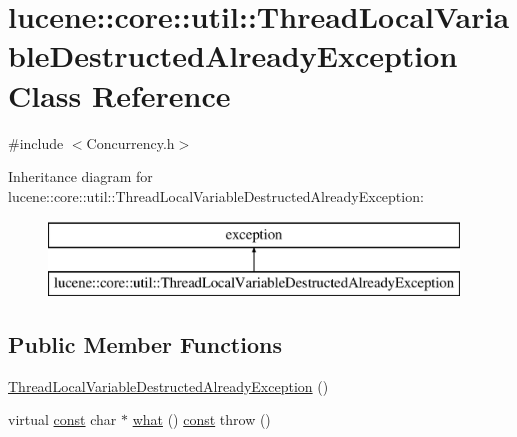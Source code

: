 \hypertarget{classlucene_1_1core_1_1util_1_1ThreadLocalVariableDestructedAlreadyException}{}\section{lucene\+:\+:core\+:\+:util\+:\+:Thread\+Local\+Variable\+Destructed\+Already\+Exception Class Reference}
\label{classlucene_1_1core_1_1util_1_1ThreadLocalVariableDestructedAlreadyException}


{\ttfamily \#include $<$Concurrency.\+h$>$}

Inheritance diagram for lucene\+:\+:core\+:\+:util\+:\+:Thread\+Local\+Variable\+Destructed\+Already\+Exception\+:\begin{figure}[H]
\begin{center}
\leavevmode
\includegraphics[height=2.000000cm]{classlucene_1_1core_1_1util_1_1ThreadLocalVariableDestructedAlreadyException}
\end{center}
\end{figure}
\subsection*{Public Member Functions}
\begin{DoxyCompactItemize}
\item 
\mbox{\hyperlink{classlucene_1_1core_1_1util_1_1ThreadLocalVariableDestructedAlreadyException_aeead4938bdae97721f6aa94bcdace7a4}{Thread\+Local\+Variable\+Destructed\+Already\+Exception}} ()
\item 
virtual \mbox{\hyperlink{ZlibCrc32_8h_a2c212835823e3c54a8ab6d95c652660e}{const}} char $\ast$ \mbox{\hyperlink{classlucene_1_1core_1_1util_1_1ThreadLocalVariableDestructedAlreadyException_a519acaa7126c57d0c66b1101afa97d38}{what}} () \mbox{\hyperlink{ZlibCrc32_8h_a2c212835823e3c54a8ab6d95c652660e}{const}}  throw ()
\end{DoxyCompactItemize}


